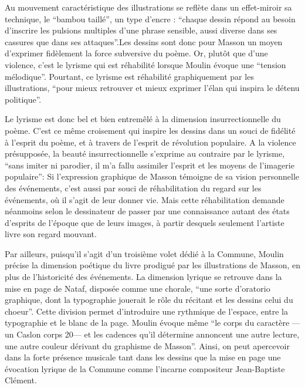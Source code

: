 	Au mouvement caractéristique des illustrations se reflète dans un effet-miroir sa technique, le \enquote{bambou taillé}, un type d’encre : \enquote{chaque dessin répond au besoin d’inscrire les pulsions multiples d’une phrase sensible, aussi diverse dans ses cassures que dans ses attaques}.Les dessins sont donc pour Masson un moyen d’exprimer fidèlement la force subversive du poème. Or, plutôt que d’une violence, c’est le lyrisme qui est réhabilité lorsque Moulin évoque une \enquote{tension mélodique}. Pourtant, ce lyrisme est réhabilité graphiquement par les illustrations, \enquote{pour mieux retrouver et mieux exprimer l’élan qui inspira le détenu politique}. 

Le lyrisme est donc bel et bien entremêlé à la dimension insurrectionnelle du poème. C’est ce même croisement qui inspire les dessins dans un souci de fidélité à l’esprit du poème, et à travers de l’esprit de révolution populaire. A la violence présupposée, la beauté insurrectionnelle s’exprime au contraire par le lyrisme, \enquote{sans imiter ni parodier, il m’a fallu assimiler l’esprit et les moyens de l’imagerie populaire}: Si l’expression graphique de Masson témoigne de sa vision personnelle des événements, c’est aussi par souci de réhabilitation du regard sur les événements, où il s’agit de leur donner vie. Mais cette réhabilitation demande néanmoins selon le dessinateur de passer par une connaissance autant des états d’esprits de l’époque que de leurs images, à partir desquels seulement l’artiste livre son regard mouvant. 

Par ailleurs, puisqu’il s’agit d’un troisième volet dédié à la Commune, Moulin précise la dimension poétique du livre prodigué par les illustrations de Masson, en plus de l’historicité des événements. La dimension lyrique se retrouve dans la mise en page de Nataf, disposée comme une chorale, \enquote{une sorte d’oratorio graphique, dont la typographie jouerait le rôle du récitant et les dessins celui du choeur}. Cette division permet d’introduire une rythmique de l’espace, entre la typographie et le blanc de la page. Moulin évoque même \enquote{le corps du caractère — un Caslon corps 20— et les cadences qu’il détermine annoncent une autre lecture, une autre couleur dérivant du graphisme de Masson}. Ainsi, on peut apercevoir dans la forte présence musicale tant dans les dessins que la mise en page une évocation lyrique de la Commune comme l’incarne compositeur Jean-Baptiste Clément. 

